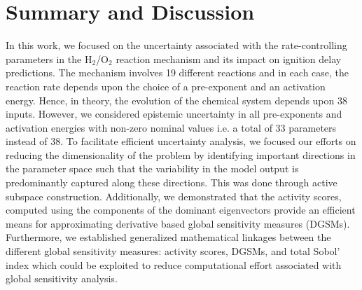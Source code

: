 \section{Summary and Discussion}
\label{sec:conc}

%
 
In this work, we focused on the uncertainty associated with the
rate-controlling parameters in the H$_2$/O$_2$ reaction mechanism and its
impact on ignition delay predictions. The mechanism involves 19 different
reactions and in each case, the reaction rate depends upon the choice of a
pre-exponent and an activation energy. Hence, in theory, the evolution of the
chemical system depends upon 38 inputs. However, we considered 
epistemic uncertainty in all pre-exponents and activation energies with non-zero
nominal values i.e. a total of 33 parameters instead of 38.  
To facilitate efficient uncertainty analysis, we focused our efforts on
reducing the dimensionality of the problem by identifying important directions
in the parameter space such that the variability in the model output is
predominantly captured along these directions. This was done through active
subspace construction.  Additionally, we demonstrated that the activity scores,
computed using the components of the dominant eigenvectors provide an efficient
means for approximating derivative based global sensitivity measures (DGSMs).
Furthermore, we established generalized mathematical linkages between the
different global sensitivity measures: activity scores, DGSMs, and total Sobol'
index which could be exploited to reduce computational effort associated with
global sensitivity analysis. 
 

